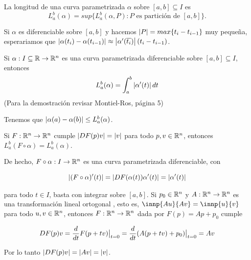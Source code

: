 \documentclass{article}
\begin{document}
\begin{dfn}
    La longitud de una curva parametrizada $\alpha$ sobre $[a,b]\subseteq I$ es
    \begin{equation*}
        L_{a}^{b}(\alpha)=sup\{L_{a}^{b}(\alpha,P):P\text{ es partición de }[a,b]\}.
    \end{equation*}
\end{dfn}

\noindent Si $\alpha$ es diferenciable sobre $[a,b]$ y hacemos $\left|P \right|=max\{t_{i}-t_{i-1}\}$ muy
pequeña, esperariamos que $\left|\alpha(t_{i})-\alpha(t_{i-1}) \right|\approx
\left|\alpha'(\overline{t_{i}}) \right|(t_{i}-t_{i-1})$.

\begin{prop}
    Si $\alpha:I\subseteq\mathbb{R}\to\mathbb{R}^{n}$ es una curva parametrizada diferenciable sobre $[a,b]
    \subseteq I$, entonces 
    \begin{equation*}
        L_{a}^{b}(\alpha)=\int_{a}^{b}\left|\alpha'(t) \right|dt
    \end{equation*}
    (Para la demostración revisar Montiel-Ros, página 5)
\end{prop}

\begin{cor}
    Tenemos que $\left|\alpha(a)-\alpha(b) \right|\leq L_{a}^{b}(\alpha)$.
\end{cor}

\begin{cor}
    Si $F:\mathbb{R}^{n}\to\mathbb{R}^{n}$ cumple $\left|DF(p)v \right|=\left|v \right|$ para todo $p,v\in\mathbb{R}^{n}$, entonces
    $L_{a}^{b}(F\circ\alpha)=L_{a}^{b}(\alpha)$.
\end{cor}

\noindent De hecho, $F\circ\alpha: I\to\mathbb{R}^{n}$ es una curva parametrizada diferenciable, con

\begin{equation*}
    \left|(F\circ\alpha)'(t) \right|=\left|DF(\alpha(t))\alpha'(t) \right|=\left|\alpha'(t) \right|
\end{equation*}

\noindent para todo $t\in I$, basta con integrar sobre $[a,b]$. Si $p_{0}\in\mathbb{R}^{n}$ y 
$A:\mathbb{R}^{n}\to\mathbb{R}^{n}$ es una transformación lineal ortogonal , esto es, $\innp{Au}{Av}=\innp{u}{v}$ 
para todo $u,v\in\mathbb{R}^{n}$, entonces $F:\mathbb{R}^{n}\to\mathbb{R}^{n}$ dada por $F(p)=Ap+p_{0}$ cumple

\begin{equation*}
    DF(p)v=\frac{d}{dt}F(p+tv)\big|_{t=0}=\frac{d}{dt}(A(p+tv)+p_{0})\big|_{t=0}=Av
\end{equation*}

\noindent Por lo tanto $\left|DF(p)v \right|=\left|Av \right|=\left|v \right|$.
\end{document}
